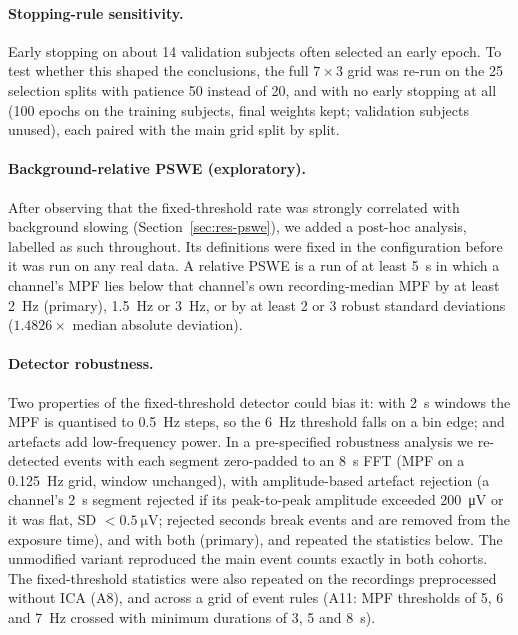 \paragraph{Stopping-rule sensitivity.} Early stopping on about 14 validation subjects often selected
an early epoch. To test whether this shaped the conclusions, the full $7\times3$ grid was re-run on
the 25 selection splits with patience 50 instead of 20, and with no early stopping at all (100
epochs on the training subjects, final weights kept; validation subjects unused), each paired with
the main grid split by split.

\paragraph{Background-relative PSWE (exploratory).} After observing that the fixed-threshold rate
was strongly correlated with background slowing (Section~\ref{sec:res-pswe}), we added a
post-hoc analysis, labelled as such throughout. Its definitions were fixed in the configuration
before it was run on any real data. A relative PSWE is a run of at least \SI{5}{\second} in which a
channel's MPF lies below that channel's own recording-median MPF by at least \SI{2}{\hertz}
(primary), \SI{1.5}{\hertz} or \SI{3}{\hertz}, or by at least 2 or 3 robust standard deviations
($1.4826\times$ median absolute deviation).

\paragraph{Detector robustness.} Two properties of the fixed-threshold detector could bias it: with
\SI{2}{\second} windows the MPF is quantised to \SI{0.5}{\hertz} steps, so the \SI{6}{\hertz} threshold
falls on a bin edge; and artefacts add low-frequency power. In a pre-specified robustness analysis we
re-detected events with each segment zero-padded to an \SI{8}{\second} FFT (MPF on a
\SI{0.125}{\hertz} grid, window unchanged), with amplitude-based artefact rejection (a channel's
\SI{2}{\second} segment rejected if its peak-to-peak amplitude exceeded \SI{200}{\micro\volt} or it was
flat, SD $<\SI{0.5}{\micro\volt}$; rejected seconds break events and are removed from the exposure
time), and with both (primary), and repeated the statistics below. The unmodified variant reproduced
the main event counts exactly in both cohorts. The fixed-threshold statistics were also repeated on
the recordings preprocessed without ICA (A8), and across a grid of event rules (A11: MPF thresholds of 5, 6
and \SI{7}{\hertz} crossed with minimum durations of 3, 5 and \SI{8}{\second}).

